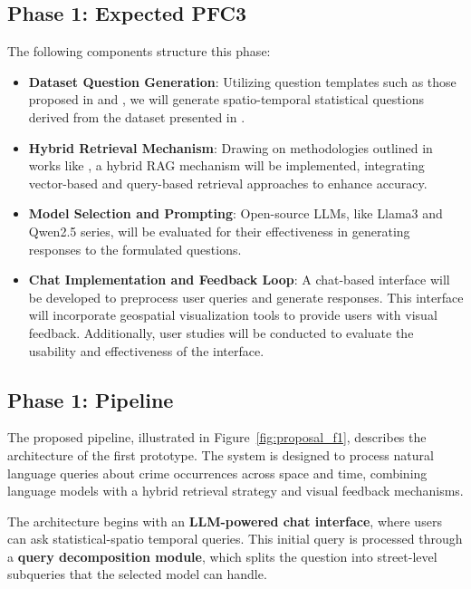 \subsection{Phase 1: Expected PFC3}

The following components structure this phase:

\begin{itemize}
    \item \textbf{Dataset Question Generation}: Utilizing question templates such as those proposed in \cite{Contractor2020QATourism} and \cite{Dai2024QASTKG}, we will generate spatio-temporal statistical questions derived from the dataset presented in \cite{Zhang2025CrimeDatasetChina}.
    \item \textbf{Hybrid Retrieval Mechanism}: Drawing on methodologies outlined in works like \cite{Guo2024LightRAG}, a hybrid RAG mechanism will be implemented, integrating vector-based and query-based retrieval approaches to enhance accuracy.
    \item \textbf{Model Selection and Prompting}: Open-source LLMs, like Llama3 \cite{Grattafiori2024Llama3} and Qwen2.5 \cite{Qwen2025Qwen2.5} series, will be evaluated for their effectiveness in generating responses to the formulated questions.
    \item \textbf{Chat Implementation and Feedback Loop}: A chat-based interface will be developed to preprocess user queries and generate responses. This interface will incorporate geospatial visualization tools to provide users with visual feedback. Additionally, user studies will be conducted to evaluate the usability and effectiveness of the interface.
\end{itemize}



\subsection{Phase 1: Pipeline}

The proposed pipeline, illustrated in Figure~\ref{fig:proposal_f1}, describes the architecture of the first prototype. The system is designed to process natural language queries about crime occurrences across space and time, combining language models with a hybrid retrieval strategy and visual feedback mechanisms.

The architecture begins with an \textbf{LLM-powered chat interface}, where users can ask statistical-spatio temporal queries. This initial query is processed through a \textbf{query decomposition module}, which splits the question into street-level subqueries that the selected model can handle.

